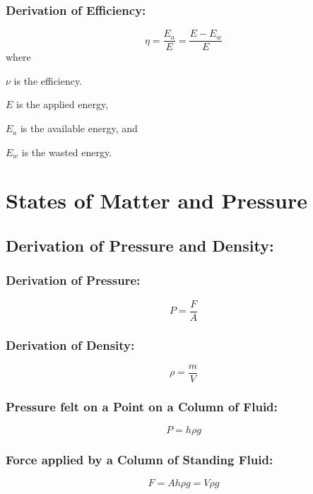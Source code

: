 \documentclass[a4paper]{report}
\begin{document}
        \subsection{Derivation of Efficiency: }
            \begin{equation}
                \eta = \frac{E_a}{E} = \frac{E - E_w}{E}
            \end{equation}
            where
            \begin{description}
                \item $\nu$ is the efficiency.
                \item $E$ is the applied energy,
                \item $E_a$ is the available energy, and
                \item $E_w$ is the wasted energy.
            \end{description}
            
\chapter{States of Matter and Pressure}
    \section{Derivation of Pressure and Density: }
        \subsection{Derivation of Pressure: }
            \begin{equation}
                P = \frac{F}{A}
            \end{equation}
        \subsection{Derivation of Density: }
            \begin{equation}
                \rho = \frac{m}{V}
            \end{equation}
        \subsection{Pressure felt on a Point on a Column of Fluid: }
            \begin{equation}
                P = h \rho g
            \end{equation}
        \subsection{Force applied by a Column of Standing Fluid: }
            \begin{equation}
                F = Ah \rho g = V \rho g
            \end{equation}
\end{document}
